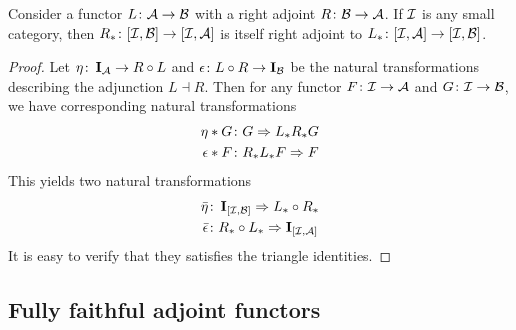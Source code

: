  \begin{prop}
    Consider a functor $L\colon{\cal A}\to{\cal B}$ with a right adjoint $R\colon{\cal B}\to{\cal A}$. If ${\cal I}$ is any small category, then $R_{\ast}\colon[{\cal I},{\cal B}]\to[{\cal I},{\cal A}]$ is itself right adjoint to $L_{\ast}\colon[{\cal I},{\cal A}]\to[{\cal I},{\cal B}]$.
  \end{prop}
  \begin{proof}
    Let $\eta\colon\operatorname{\mathbf{I}}_{{\cal A}} \to R \circ L$ and $\epsilon\colon L \circ R \to \operatorname{\mathbf{I}}_{{\cal B}}$ be the natural transformations describing the adjunction $L\dashv R$. Then for any functor $F\colon{\cal I}\to{\cal A}$ and $G\colon{\cal I}\to{\cal B}$, we have corresponding natural transformations
    \begin{align*}
      \eta\ast G&\colon G\Rightarrow L_{\ast}R_{\ast}G  \\
      \epsilon\ast F&\colon R_{\ast}L_{\ast}F\Rightarrow F
    \end{align*}
    This yields two natural transformations
    \begin{align*}
      \bar{\eta}&\colon \operatorname{\mathbf{I}}_{[{\cal I},{\cal B}]}\Rightarrow L_{\ast}\circ R_{\ast}  \\
      \bar{\epsilon}&\colon R_{\ast}\circ L_{\ast}\Rightarrow \operatorname{\mathbf{I}}_{[{\cal I},{\cal A}]}
    \end{align*}
    It is easy to verify that they satisfies the triangle identities.
  \end{proof}

\subsection{Fully faithful adjoint functors}

